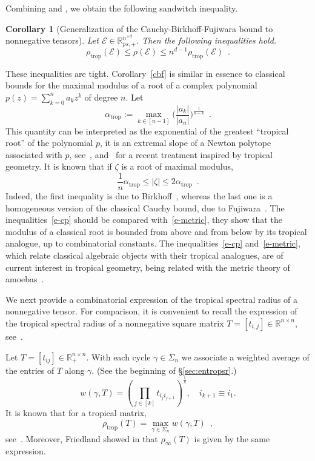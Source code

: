 \documentclass{amsart}
\newcommand{\R}{\mathbb{R}}
\newcommand{\0}{\mathbf{0}}
\newcommand{\1}{\mathbf{1}}
\newcommand{\cE}{\mathcal{E}}
\newcommand{\trop}{\mathrm{trop}}
\newtheorem{corollary}[theo]{Corollary}
\theoremstyle{remark}
\numberwithin{equation}{section} %
\renewcommand{\leq}{\leqslant}
\begin{document}
%
%
%
%
%
%
%
%
Combining  and , we obtain the following
sandwitch inequality.
%
%
%
%
%
%
\begin{corollary}[Generalization of the Cauchy-Birkhoff-Fujiwara bound to nonnegative tensors]
%
\label{cbf}
Let $\cE\in \R_{ps,+}^{n^{\times d}}$.  Then the following inequalities hold.
\begin{equation}
\rho_{\trop}(\cE) \leq \rho(\cE) \leq n^{d-1} \rho_{\trop}(\cE) \enspace .
\label{e-metric}
\end{equation}
\end{corollary}
These inequalities are tight.
%
%
%
Corollary~\eqref{cbf}
is similar in essence to classical bounds
for the maximal modulus of a root of a complex polynomial
$p(z)=\sum_{k=0}^n a_k z^k$ of degree $n$. Let 
\[
\alpha_{\trop}:= \max_{k\in [n-1]} \Big(\frac{|a_k|}{|a_n|}\Big)^{\frac{1}{n-k}} \enspace.
\]
This quantity can be interpreted as the exponential of the greatest ``tropical
root'' of the polynomial $p$, it is an extremal slope of a Newton polytope
associated with $p$, see~\cite{Ostrowski1}, and~\cite{logmajorization2013}
for a recent treatment inspired by tropical geometry. 
It is known that if $\zeta$ is a root of maximal modulus,
\begin{equation}
\frac{1}{n} \alpha_{\trop} \leq |\zeta|\leq 2 \alpha_{\trop}  \enspace .
\label{e-cp}
\end{equation}
Indeed, the first inequality is due to Birkhoff~\cite{birkhoff}, whereas the last one
is a homogeneous version of the classical Cauchy bound, due to Fujiwara~\cite{fujiwara}. 
The inequalities~\eqref{e-cp} should be compared with~\eqref{e-metric}, they
show that the modulus of a classical root is bounded from above and from
below by its tropical analogue, up to combinatorial constants.
The inequalities~\eqref{e-cp}  and~\eqref{e-metric}, which relate classical algebraic objects with their tropical analogues, are of current interest in tropical geometry, being related with the metric theory of amoebas~\cite{AVENDANO201845}. 
%
%


We next provide a combinatorial expression of the tropical spectral
radius of a nonnegative tensor. For comparison, it is convenient
to recall the expression of the tropical spectral radius of a nonnegative square matrix $T=[t_{i,j}]\in\R^{n\times n}$, see~\cite{bcoq,butkovic}.

 Let $T=[t_{ij}]\in\R_+^{n\times n}$. With each cycle $\gamma\in\Sigma_n$ we associate a weighted average of the entries of $T$ along $\gamma$.  (See the beginning of \S\ref{sec:entropsr}.)
 \begin{equation}\label{defwcycle}
 w(\gamma,T)=(\prod_{j\in [k]} t_{i_ji_{j+1}})^{\frac{1}{k}}, \quad i_{k+1}\equiv i_1.
 \end{equation}
It is known that for a tropical matrix,
\begin{equation}\label{matropsrchar}
 \rho_{\trop}(T)=\max_{\gamma\in\Sigma_n} w(\gamma,T) \enspace,
\end{equation}
see~\cite{bcoq,butkovic}.
Moreover, Friedland showed in \cite{Fri86} that $\rho_\infty(T)$
is given by the same expression.
\end{document}
